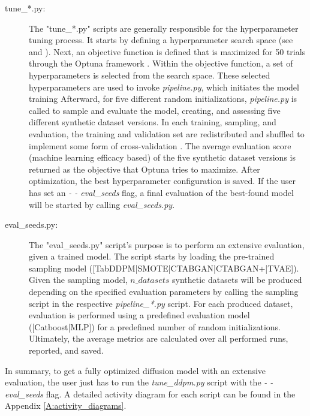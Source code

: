 \begin{description}
	\item[tune\_*.py\footnotemark:]
		The "tune\_*.py" scripts are generally responsible for the hyperparameter tuning process.
		It starts by defining a hyperparameter search space (see \cite[Table 1, p. 4]{kotelnikov2022TabDDPMModellingTabular} and \cite[Table 7-11, p. 13 f.]{kotelnikov2022TabDDPMModellingTabular}).
		Next, an objective function is defined that is maximized for 50 trials through the Optuna framework \cite{optuna_2019}.
		Within the objective function, a set of hyperparameters is selected from the search space.
		These selected hyperparameters are used to invoke \textit{pipeline.py}, which initiates the \gls{model} training
		Afterward, for five different random initializations, \textit{pipeline.py} is called to sample and evaluate the \gls{model}, creating, and assessing five different synthetic dataset versions.
		In each training, sampling, and evaluation, the training and validation set are redistributed and shuffled to implement some form of cross-validation \cite{kohavi1995StudyCrossvalidationBootstrap}.
		The average evaluation score (machine learning efficacy based) of the five synthetic dataset versions is returned as the objective that Optuna tries to maximize.
		After optimization, the best hyperparameter configuration is saved.
		If the user has set an \textit{- - eval\_seeds} flag, a final evaluation of the best-found \gls{model} will be started by calling \textit{eval\_seeds.py}.
		
	\item[eval\_seeds.py:]
		The "eval\_seeds.py" script's purpose is to perform an extensive evaluation, given a trained \gls{model}.
		The script starts by loading the pre-trained sampling \gls{model} ([TabDDPM|SMOTE|CTABGAN|CTABGAN+|TVAE]).
		Given the sampling \gls{model}, $n\_datasets$ synthetic datasets will be produced depending on the specified evaluation parameters by calling the sampling script in the respective \textit{pipeline\_*.py} script.
		For each produced dataset, evaluation is performed using a predefined evaluation \gls{model} ([Catboost|MLP]) for a predefined number of random initializations.
		Ultimately, the average metrics are calculated over all performed runs, reported, and saved.
\end{description}

In summary, to get a fully optimized diffusion \gls{model} with an extensive evaluation, the user just has to run the \textit{tune\_ddpm.py} script with the \textit{- - eval\_seeds} flag.
A detailed activity diagram for each script can be found in the Appendix \ref{A:activity_diagrams}.

